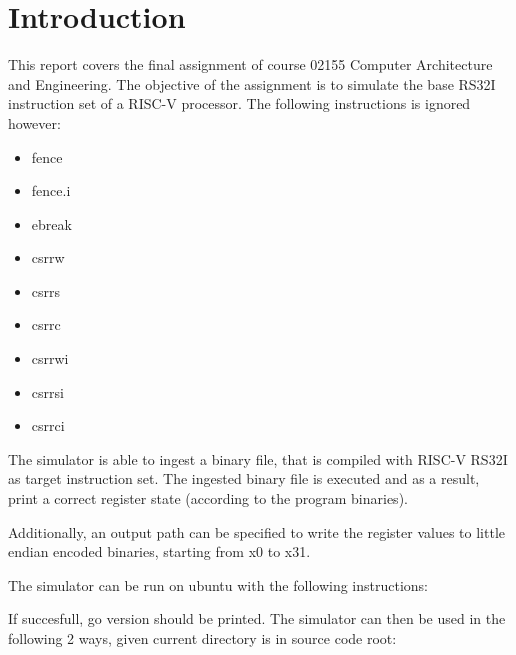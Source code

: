 \section{Introduction}

This report covers the final assignment of course 02155 Computer Architecture and Engineering.
The objective of the assignment is to simulate the base RS32I instruction set of a RISC-V processor.
The following instructions is ignored however:
\begin{itemize}
    \item fence
    \item fence.i
    \item ebreak
    \item csrrw
    \item csrrs
    \item csrrc
    \item csrrwi
    \item csrrsi
    \item csrrci
\end{itemize}

The simulator is able to ingest a binary file, that is compiled with RISC-V RS32I as target instruction set.
The ingested binary file is executed and as a result, print a correct register state (according to the program binaries).

Additionally, an output path can be specified to write the register values to little endian encoded binaries, starting from x0 to x31.

The simulator can be run on ubuntu with the following instructions:

\begin{figure}[H]
\end{figure}
If succesfull, go version should be printed.
The simulator can then be used in the following 2 ways, given current directory is in source code root:

\begin{figure}[H]
\end{figure}

\begin{figure}[H]
\end{figure}